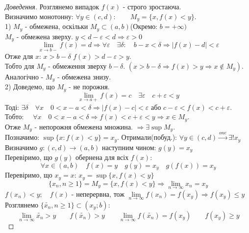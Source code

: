 \documentclass[14pt,a4paper]{scrartcl}
\theoremstyle{definition}
\theoremstyle{remark}
\theoremstyle{definition}
\theoremstyle{definition}
\begin{document}
\begin{proof}[Доведення]
  Розглянемо випадок $f(x)$ - строго зростаюча.\\
  Визначимо монотонну: $\forall y \in (c,d): \qquad M_y = \lbrace x, f(x) < y \rbrace $.\\
  1) $M_y$ - обмежена, оскільки $M_y \subset (a,b)$\qquad (Окремо: $b= +\infty)$\\
  $M_y$ - обмежена зверху. \qquad $y< d - \varepsilon  < d \Rightarrow \varepsilon >0$
  $$ \lim\limits_{x\to b-}{f(x)} = d \Rightarrow \forall \varepsilon \quad \exists \delta: \quad b - x < \delta \Rightarrow \vert f(x) - d \vert < \varepsilon  $$
  Отже для $x$: \quad $x> b- \delta$ \quad $f(x)> d- \varepsilon  > y$.\\
  Тобто для $M_y$ - обмеження зверху $ b - \delta$. $(x > b- \delta \Rightarrow f(x)> y\Rightarrow  x\notin M_y)$.\\
  Аналогічно - $M_y$ - обмежена знизу.\\
  2) Доведемо, що $M_y$ - не порожня.\\
  $$ \lim\limits_{x\to a+}{f(x)} = c \quad \exists \varepsilon \quad c+ \varepsilon  < y$$
  Тоді: \quad $ \exists \delta \quad \forall x \quad 0< x-a < \delta \Rightarrow \vert f(x) - c \vert < \varepsilon  $ або $c- \varepsilon < f(x) < c+ \varepsilon $.\\
  Тобто: $\quad \forall x  \quad 0<x-a< \delta \Rightarrow f(x)< c+\varepsilon  < y \Rightarrow x \in M_y $.\\
  Отже $M_y$ - непорожня обмежена множина. $\Rightarrow \exists \sup M_y$.\\
  Позначимо: \quad $\sup \lbrace x: f(x)< y \rbrace = x_y $.
  Отримали(побуд.): $\forall y \in (c,d) \xrightarrow{one} \exists ! x_y$\\
  Визначимо $g: (c,d) \rightarrow (a,b)$ наступним чином: \quad $g(y) = x_y$\\
  Перевіримо, що $g(y)$ обернена для всіх $f(x)$:
  $$\forall x \in (a,b) \quad f(x) = y \quad g(y) = x_y \quad g(f(x))= x_y$$
  Перевіримо, що $x_y = x$: $x_y = \sup \lbrace  x, f(x) <y \rbrace $
  $$\lbrace x_n, n \geq 1 \rbrace = M_y = \lbrace x, f(x) < y \rbrace \Longrightarrow  \lim\limits_{n\to \infty}{x_n} = x_y  $$
  $f(x_n) < y; \quad f(x)$ - неперервна, тож $ \lim\limits_{n\to\infty}{f(x_n)} = f(x_y) \Rightarrow f(x_y) \leq y$\\
  Розглянемо $\lbrace \tilde{x_n}, n \geq 1 \rbrace  \subset (x_y; b):$
  $$ \lim\limits_{n\to\infty}{\tilde{x_n}} > y \qquad f(\tilde{x_n}) > y \qquad  \lim\limits_{n\to\infty}{f(\tilde{x_n})} = f(x_y) \qquad f(x_y) \geq y  $$

\end{proof}
\end{document}
